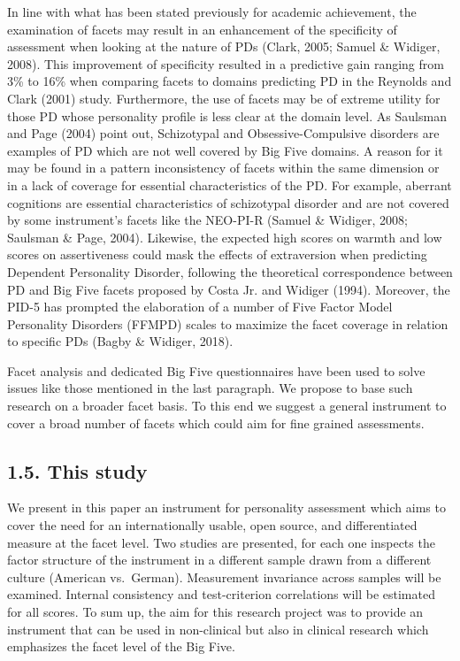 \documentclass[man]{apa6}
\theoremstyle{definition}
\theoremstyle{definition}
\theoremstyle{definition}
\theoremstyle{remark}
\begin{document}
In line with what has been stated previously for academic achievement,
the examination of facets may result in an enhancement of the
specificity of assessment when looking at the nature of PDs (Clark,
2005; Samuel \& Widiger, 2008). This improvement of specificity resulted
in a predictive gain ranging from 3\% to 16\% when comparing facets to
domains predicting PD in the Reynolds and Clark (2001) study.
Furthermore, the use of facets may be of extreme utility for those PD
whose personality profile is less clear at the domain level. As Saulsman
and Page (2004) point out, Schizotypal and Obsessive-Compulsive
disorders are examples of PD which are not well covered by Big Five
domains. A reason for it may be found in a pattern inconsistency of
facets within the same dimension or in a lack of coverage for essential
characteristics of the PD. For example, aberrant cognitions are
essential characteristics of schizotypal disorder and are not covered by
some instrument's facets like the NEO-PI-R (Samuel \& Widiger, 2008;
Saulsman \& Page, 2004). Likewise, the expected high scores on warmth
and low scores on assertiveness could mask the effects of extraversion
when predicting Dependent Personality Disorder, following the
theoretical correspondence between PD and Big Five facets proposed by
Costa Jr. and Widiger (1994). Moreover, the PID-5 has prompted the
elaboration of a number of Five Factor Model Personality Disorders
(FFMPD) scales to maximize the facet coverage in relation to specific
PDs (Bagby \& Widiger, 2018).

Facet analysis and dedicated Big Five questionnaires have been used to
solve issues like those mentioned in the last paragraph. We propose to
base such research on a broader facet basis. To this end we suggest a
general instrument to cover a broad number of facets which could aim for
fine grained assessments.

\hypertarget{this-study}{%
\subsection{1.5. This study}\label{this-study}}

We present in this paper an instrument for personality assessment which
aims to cover the need for an internationally usable, open source, and
differentiated measure at the facet level. Two studies are presented,
for each one inspects the factor structure of the instrument in a
different sample drawn from a different culture (American vs.~German).
Measurement invariance across samples will be examined. Internal
consistency and test-criterion correlations will be estimated for all
scores. To sum up, the aim for this research project was to provide an
instrument that can be used in non-clinical but also in clinical
research which emphasizes the facet level of the Big Five.
\end{document}
